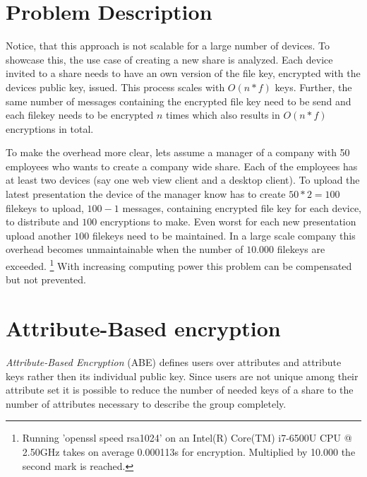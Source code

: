 \section{Problem Description}

Notice, that this approach is not scalable for a large number of devices. To showcase this, the use case of creating a new share is analyzed. Each device invited to a share needs to have an own version of the file key, encrypted with the devices public key, issued. This process scales with $O(n * f)$ keys. 
Further, the same number of messages containing the encrypted file key need to be send and each filekey needs to be encrypted $n$ times which also results in $O(n * f)$ encryptions in total. 

To make the overhead more clear, lets assume a manager of a company with 50 employees who wants to create a company wide share. Each of the employees has at least two devices (say one web view client and a desktop client). To upload the latest presentation the device of the manager know has to create $50 * 2 = 100$ filekeys to upload, $100-1$ messages, containing encrypted file key for each device, to distribute and $100$ encryptions to make. Even worst for each new presentation upload another $100$ filekeys need to be maintained. In a large scale company this overhead becomes unmaintainable when the number of $10.000$ filekeys are exceeded. \footnote{Running 'openssl speed rsa1024' on an Intel(R) Core(TM) i7-6500U CPU @ 2.50GHz takes on average 0.000113s for encryption. Multiplied by 10.000 the second mark is reached.} With increasing computing power this problem can be compensated but not prevented.

\section{Attribute-Based encryption}
\textit{Attribute-Based Encryption} (\ac{ABE}) defines users over attributes and attribute keys rather then its individual public key. Since users are not unique among their attribute set it is possible to reduce the number of needed keys of a share to the number of attributes necessary to describe the group completely. 

